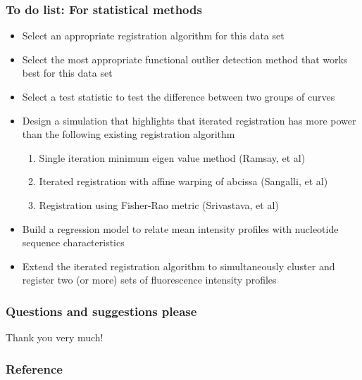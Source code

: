 \documentclass[10pt,dvipsnames,table]{beamer}
\begin{document}
\begin{frame}
\frametitle{To do list: For statistical methods}
\begin{itemize}
\item[\checkmark] Select an appropriate registration algorithm for this data set
\item[\checkmark] Select the most appropriate functional outlier detection method that works best for this data set
\item[\checkmark] Select a test statistic to test the difference between two groups of curves
\item Design a simulation that highlights that iterated registration has more power than the following existing registration algorithm
\begin{enumerate}
\item Single iteration minimum eigen value method (Ramsay, et al)
\item Iterated registration with affine warping of abcissa (Sangalli, et al)
\item Registration using Fisher-Rao metric (Srivastava, et al)
\end{enumerate}
\item Build a regression model to relate mean intensity profiles with nucleotide sequence characteristics
\item Extend the iterated registration algorithm to simultaneously cluster and register two (or more) sets of fluorescence intensity profiles
\end{itemize}
\end{frame}

\begin{frame}
\frametitle{Questions and suggestions please}

Thank you very much!

\end{frame}

\begin{frame}
\frametitle{Reference}
{\footnotesize{
    
    
}}
\end{frame}
\end{document}
